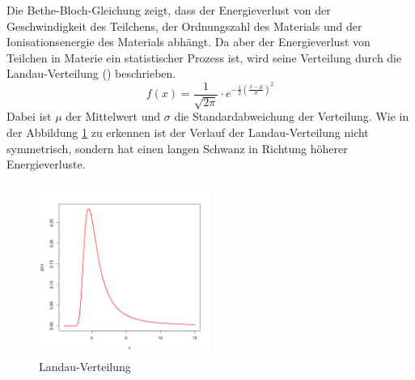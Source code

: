 \documentclass{article}
\begin{document}
Die Bethe-Bloch-Gleichung zeigt, dass der Energieverlust von der Geschwindigkeit des Teilchens, der Ordnungszahl des Materials und der Ionisationsenergie des Materials abhängt.
Da aber der Energieverlust von Teilchen in Materie ein statistischer Prozess ist, wird seine Verteilung durch die Landau-Verteilung (\cite{Landau}) beschrieben.
\begin{equation*}
    f(x) = \frac{1}{\sqrt{2\pi}} \cdot e^{-\frac{1}{2} \left(\frac{x - \mu}{\sigma}\right)^2}    
\end{equation*}
Dabei ist $\mu$ der Mittelwert und $\sigma$ die Standardabweichung der Verteilung.
Wie in der Abbildung \ref{fig:Landau} zu erkennen ist der Verlauf der Landau-Verteilung nicht symmetrisch, sondern hat einen langen Schwanz in Richtung höherer Energieverluste.
\begin{figure}[H]
    \centering
    \includegraphics[width=0.5\textwidth]{figures/Landau.png}
    \caption{Landau-Verteilung \cite{Landau}}
    \label{fig:Landau}
\end{figure}

\end{document}
